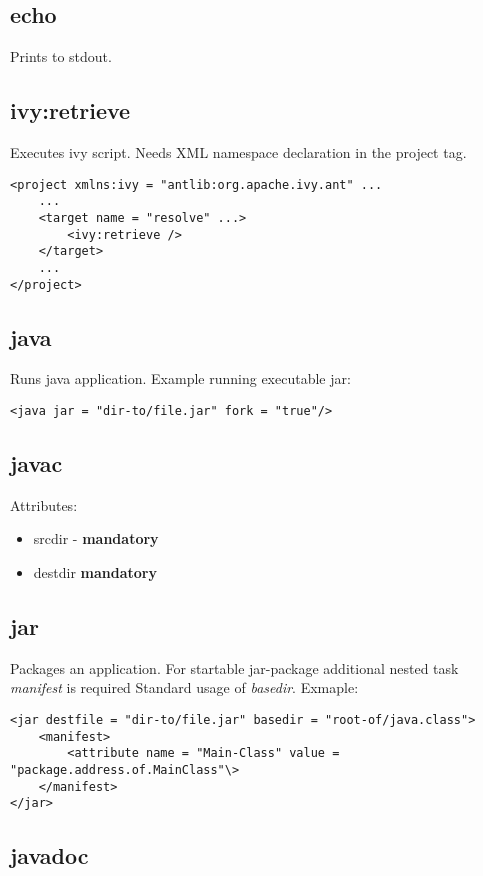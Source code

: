 \documentclass{report}
\begin{document}
\subsection{echo}
Prints to stdout.

\subsection{ivy:retrieve}
Executes ivy script. Needs XML namespace declaration in the project tag.
\begin{verbatim}
<project xmlns:ivy = "antlib:org.apache.ivy.ant" ...
    ...
    <target name = "resolve" ...>
        <ivy:retrieve />
    </target>
    ...
</project>
\end{verbatim}

\subsection{java}
Runs java application. Example running executable jar:
\begin{verbatim}
<java jar = "dir-to/file.jar" fork = "true"/>
\end{verbatim}

\subsection{javac}
Attributes:
\begin{itemize}
  \item srcdir - \textbf{mandatory}
  \item destdir \textbf{mandatory}
\end{itemize}

\subsection{jar}
Packages an application. For startable jar-package additional nested task \textit{manifest} is required
Standard usage of \textit{basedir}. Exmaple:
\begin{verbatim}
<jar destfile = "dir-to/file.jar" basedir = "root-of/java.class">
    <manifest>
        <attribute name = "Main-Class" value = "package.address.of.MainClass"\>
    </manifest>
</jar>
\end{verbatim}

\subsection{javadoc}
\end{document}
